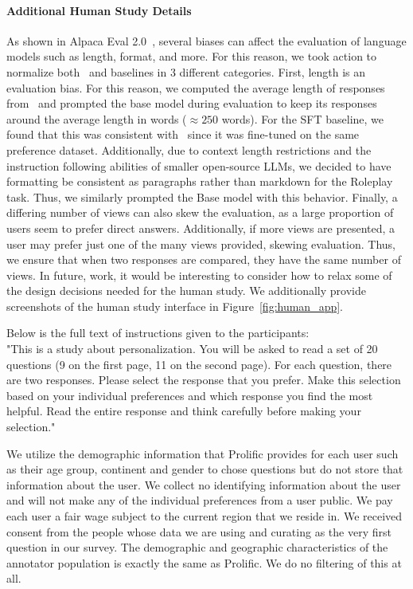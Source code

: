 \paragraph{Additional Human Study Details}
As shown in Alpaca Eval 2.0~\citep{dubois2024lengthcontrolledalpacaevalsimpleway}, several biases can affect the evaluation of language models such as length, format, and more. For this reason, we took action to normalize both \methodname\ and baselines in 3 different categories. First, length is an evaluation bias. For this reason, we computed the average length of responses from \methodname\ and prompted the base model during evaluation to keep its responses around the average length in words ($\approx 250$ words). For the SFT baseline, we found that this was consistent with \methodname\ since it was fine-tuned on the same preference dataset. Additionally, due to context length restrictions and the instruction following abilities of smaller open-source LLMs, we decided to have formatting be consistent as paragraphs rather than markdown for the Roleplay task. Thus, we similarly prompted the Base model with this behavior. Finally, a differing number of views can also skew the evaluation, as a large proportion of users seem to prefer direct answers. Additionally, if more views are presented, a user may prefer just one of the many views provided, skewing evaluation. Thus, we ensure that when two responses are compared, they have the same number of views. In future, work, it would be interesting to consider how to relax some of the design decisions needed for the human study. We additionally provide screenshots of the human study interface in Figure~\ref{fig:human_app}.

Below is the full text of instructions given to the participants: \\
"This is a study about personalization. You will be asked to read a set of 20 questions (9 on the first page, 11 on the second page). For each question, there are two responses. Please select the response that you prefer. Make this selection based on your individual preferences and which response you find the most helpful. Read the entire response and think carefully before making your selection."

We utilize the demographic information that Prolific provides for each user such as their age group, continent and gender to chose questions but do not store that information about the user. We collect no identifying information about the user and will not make any of the individual preferences from a user public. We pay each user a fair wage subject to the current region that we reside in. We received consent from the people whose data we are using and curating as the very first question in our survey. The demographic and geographic characteristics of the annotator population is exactly the same as Prolific. We do no filtering of this at all.

